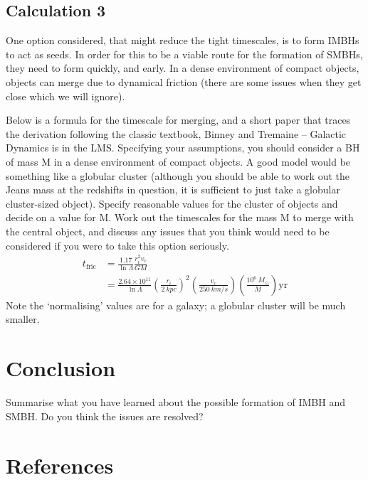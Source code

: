 \documentclass[a4paper]{article} %
\begin{document}
\subsection{Calculation 3}
\begin{framed}
One option considered, that might reduce the tight timescales, is to form IMBHs to act as seeds. In order for this to be a viable route for the formation of SMBHs, they need to form quickly, and early. In a dense environment of compact objects, objects can merge due to dynamical friction (there are some issues when they get close which we will ignore).

Below is a formula for the timescale for merging, and a short paper that traces the derivation following the classic textbook, Binney and Tremaine – Galactic Dynamics is in the LMS. Specifying your assumptions, you should consider a BH of mass M in a dense environment of compact objects. A good model would be something like a globular cluster (although you should be able to work out the Jeans mass at the redshifts in question, it is sufficient to just take a globular cluster-sized object). Specify reasonable values for the cluster of objects and decide on a value for M. Work out the timescales for the mass M to merge with the central object, and discuss any issues that you think would need to be considered if you were to take this option seriously.
\begin{align}
t_{\text{fric}}&=\frac{1.17}{\ln \Lambda}\frac{r_i^2 v_c}{GM}\\
&=\frac{2.64\times 10^{11}}{\ln \Lambda}\left(\frac{r_i}{\SI{2}{kpc}}\right)^2\left(\frac{v_c}{\SI{250}{km/s}}\right)\left(\frac{10^6~M_{\odot}}{M}\right)\text{yr}
\end{align}
Note the ‘normalising’ values are for a galaxy; a globular cluster will be much smaller.
\end{framed}


\section{Conclusion}
Summarise what you have learned about the possible formation of IMBH and SMBH. Do you think the issues are resolved?




\pagebreak

\section{References}



\end{document}
